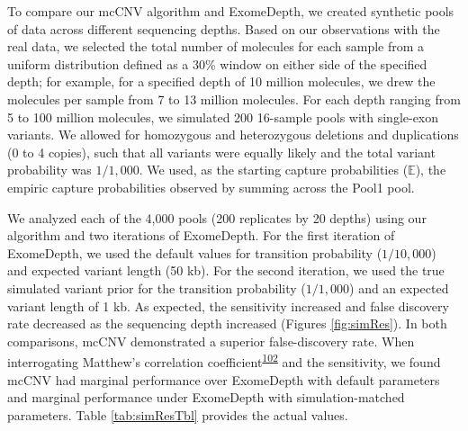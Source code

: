 \documentclass[11pt,letterpaper]{book}
\begin{document}
To compare our mcCNV algorithm and ExomeDepth, we created synthetic pools of data across different sequencing depths.
Based on our observations with the real data, we selected the total number of molecules for each sample from a uniform distribution defined as a 30\% window on either side of the specified depth; for example, for a specified depth of 10 million molecules, we drew the molecules per sample from 7 to 13 million molecules.
For each depth ranging from 5 to 100 million molecules, we simulated 200 16-sample pools with single-exon variants.
We allowed for homozygous and heterozygous deletions and duplications (0 to 4 copies), such that all variants were equally likely and the total variant probability was \(1/1,000\).
We used, as the starting capture probabilities (\(\mathbb{E}\)), the empiric capture probabilities observed by summing across the Pool1 pool.

We analyzed each of the 4,000 pools (200 replicates by 20 depths) using our algorithm and two iterations of ExomeDepth.
For the first iteration of ExomeDepth, we used the default values for transition probability (\(1/10,000\)) and expected variant length (50 kb).
For the second iteration, we used the true simulated variant prior for the transition probability (\(1/1,000\)) and an expected variant length of 1 kb.
As expected, the sensitivity increased and false discovery rate decreased as the sequencing depth increased (Figures \ref{fig:simRes}).
In both comparisons, mcCNV demonstrated a superior false-discovery rate.
When interrogating Matthew's correlation coefficient\textsuperscript{\protect\hyperlink{ref-matthews:1975aa}{102}} and the sensitivity, we found mcCNV had marginal performance over ExomeDepth with default parameters and marginal performance under ExomeDepth with simulation-matched parameters. Table \ref{tab:simResTbl} provides the actual values.
\end{document}
